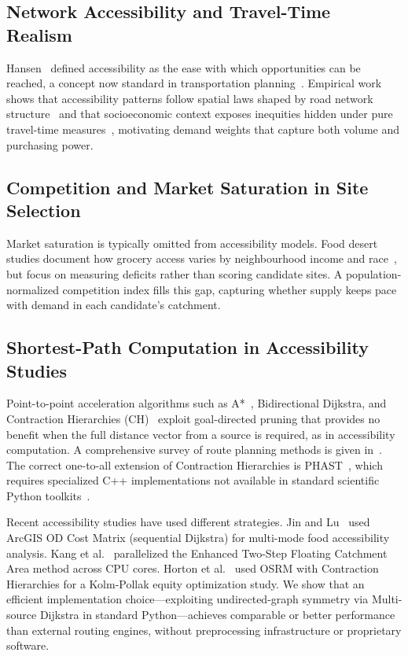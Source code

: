 \documentclass[conference]{IEEEtran}
\begin{document}
\subsection{Network Accessibility and Travel-Time Realism}

Hansen~\cite{Hansen1959} defined accessibility as the ease with which
opportunities can be reached, a concept now standard in transportation
planning~\cite{Geurs2004,Luo2003,Wang2012}.  Empirical work shows that
accessibility patterns follow spatial laws shaped by road network
structure~\cite{Xu2020} and that socioeconomic context exposes
inequities hidden under pure travel-time measures~\cite{Kharel2024},
motivating demand weights that capture both volume and purchasing power.

\subsection{Competition and Market Saturation in Site Selection}

Market saturation is typically omitted from accessibility models.
Food desert studies document how grocery access varies by neighbourhood
income and race~\cite{Apparicio2007,Beaulac2009,VerPloeg2012}, but
focus on measuring deficits rather than scoring candidate sites.  A
population-normalized competition index fills this gap, capturing
whether supply keeps pace with demand in each candidate's catchment.

\subsection{Shortest-Path Computation in Accessibility Studies}

Point-to-point acceleration algorithms such as A*~\cite{Hart1968},
Bidirectional Dijkstra, and Contraction Hierarchies
(CH)~\cite{Geisberger2008} exploit goal-directed pruning that provides
no benefit when the full distance vector from a source is required, as
in accessibility computation.  A comprehensive survey of route
planning methods is given in~\cite{Bast2016}.  The correct one-to-all
extension of Contraction Hierarchies is PHAST~\cite{Delling2011},
which requires specialized C++ implementations not available in
standard scientific Python toolkits~\cite{Virtanen2020}.

Recent accessibility studies have used different strategies.
Jin and Lu~\cite{Jin2022} used ArcGIS OD Cost Matrix (sequential
Dijkstra) for multi-mode food accessibility analysis.  Kang et
al.~\cite{Kang2020} parallelized the Enhanced Two-Step Floating
Catchment Area method across CPU cores.  Horton et
al.~\cite{Horton2025} used OSRM with Contraction Hierarchies for a
Kolm-Pollak equity optimization study.  We show that an efficient
implementation choice---exploiting undirected-graph symmetry via
Multi-source Dijkstra in standard Python---achieves comparable or
better performance than external routing engines, without preprocessing
infrastructure or proprietary software.
\end{document}
